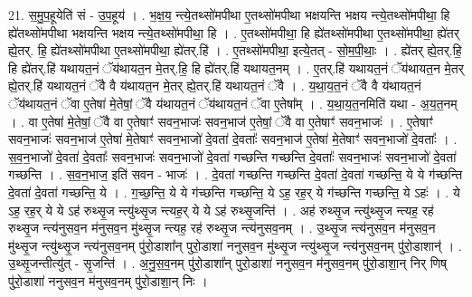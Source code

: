\documentclass[17pt]{extarticle}
\begin{document}
21. स॒मु॒प॒हूयेति॑ सं - उ॒प॒हूय॑ । . भ॒क्ष॒य॒ न्त्ये॒तथ्सो॑मपीथा ए॒तथ्सो॑मपीथा भक्षयन्ति भक्षय न्त्ये॒तथ्सो॑मपीथा॒ हि ह्ये॑तथ्सो॑मपीथा भक्षयन्ति भक्षय न्त्ये॒तथ्सो॑मपीथा॒ हि । . ए॒तथ्सो॑मपीथा॒ हि ह्ये॑तथ्सो॑मपीथा ए॒तथ्सो॑मपीथा॒ ह्ये॑तर् ह्ये॒तर्. हि॒ ह्ये॑तथ्सो॑मपीथा ए॒तथ्सो॑मपीथा॒ ह्ये॑तर्.हि॑ । . ए॒तथ्सो॑मपीथा॒ इत्ये॒तत् - सो॒म॒पी॒थाः॒ । . ह्ये॑तर् ह्ये॒तर्.हि॒ हि ह्ये॑तर्.हि॑ यथायत॒नं ॅय॑थायत॒न मे॒तर्.हि॒ हि ह्ये॑तर्.हि॑ यथायत॒नम् । . ए॒तर्.हि॑ यथायत॒नं ॅय॑थायत॒न मे॒तर् ह्ये॒तर्.हि॑ यथायत॒नं ॅवै वै य॑थायत॒न मे॒तर् ह्ये॒तर्.हि॑ यथायत॒नं ॅवै । . य॒था॒य॒त॒नं ॅवै वै य॑थायत॒नं ॅय॑थायत॒नं ॅवा ए॒तेषा॑ मे॒तेषां॒ ॅवै य॑थायत॒नं ॅय॑थायत॒नं ॅवा ए॒तेषा᳚म् । . य॒था॒य॒त॒नमिति॑ यथा - अ॒य॒त॒नम् । . वा ए॒तेषा॑ मे॒तेषां॒ ॅवै वा ए॒तेषाꣳ॑ सवन॒भाजः॑ सवन॒भाज॑ ए॒तेषां॒ ॅवै वा ए॒तेषाꣳ॑ सवन॒भाजः॑ । . ए॒तेषाꣳ॑ सवन॒भाजः॑ सवन॒भाज॑ ए॒तेषा॑ मे॒तेषाꣳ॑ सवन॒भाजो॑ दे॒वता॑ दे॒वताः᳚ सवन॒भाज॑ ए॒तेषा॑ मे॒तेषाꣳ॑ सवन॒भाजो॑ दे॒वताः᳚ । . स॒व॒न॒भाजो॑ दे॒वता॑ दे॒वताः᳚ सवन॒भाजः॑ सवन॒भाजो॑ दे॒वता॑ गच्छन्ति गच्छन्ति दे॒वताः᳚ सवन॒भाजः॑ सवन॒भाजो॑ दे॒वता॑ गच्छन्ति । . स॒व॒न॒भाज॒ इति॑ सवन - भाजः॑ । . दे॒वता॑ गच्छन्ति गच्छन्ति दे॒वता॑ दे॒वता॑ गच्छन्ति॒ ये ये ग॑च्छन्ति दे॒वता॑ दे॒वता॑ गच्छन्ति॒ ये । . ग॒च्छ॒न्ति॒ ये ये ग॑च्छन्ति गच्छन्ति॒ ये ऽह॒ रह॒र् ये ग॑च्छन्ति गच्छन्ति॒ ये ऽहः॑ । . ये ऽह॒ रह॒र् ये ये ऽह॑ रुथ्सृ॒ज न्त्यु॑थ्सृ॒ज न्त्यह॒र् ये ये ऽह॑ रुथ्सृ॒जन्ति॑ । . अह॑ रुथ्सृ॒ज न्त्यु॑थ्सृ॒ज न्त्यह॒ रह॑ रुथ्सृ॒ज न्त्य॑नुसव॒न म॑नुसव॒न मु॑थ्सृ॒ज न्त्यह॒ रह॑ रुथ्सृ॒ज न्त्य॑नुसव॒नम् । . उ॒थ्सृ॒ज न्त्य॑नुसव॒न म॑नुसव॒न मु॑थ्सृ॒ज न्त्यु॑थ्सृ॒ज न्त्य॑नुसव॒नम् पु॑रो॒डाशा᳚न् पुरो॒डाशा॑ ननुसव॒न मु॑थ्सृ॒ज न्त्यु॑थ्सृ॒ज न्त्य॑नुसव॒नम् पु॑रो॒डाशान्॑ । . उ॒थ्सृ॒जन्तीत्यु॑त् - सृ॒जन्ति॑ । . अ॒नु॒स॒व॒नम् पु॑रो॒डाशा᳚न् पुरो॒डाशा॑ ननुसव॒न म॑नुसव॒नम् पु॑रो॒डाशा॒न् निर् णिष् पु॑रो॒डाशा॑ ननुसव॒न म॑नुसव॒नम् पु॑रो॒डाशा॒न् निः । \newline
\end{document}
